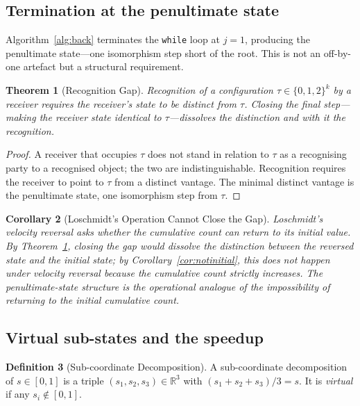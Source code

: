\documentclass[twocolumn,10pt,a4paper]{article}
\theoremstyle{thmstyle}
\newtheorem{theorem}{Theorem}[section]
\newtheorem{corollary}[theorem]{Corollary}
\theoremstyle{definition}
\newtheorem{definition}[theorem]{Definition}
\theoremstyle{remark}
\newcommand{\R}{\mathbb{R}}
\begin{document}
\subsection{Termination at the penultimate state}

Algorithm~\ref{alg:back} terminates the \texttt{while} loop at $j=1$,
producing the penultimate state---one isomorphism step short of the
root. This is not an off-by-one artefact but a structural requirement.

\begin{theorem}[Recognition Gap]
\label{thm:recog}
Recognition of a configuration $\tau\in\{0,1,2\}^{k}$ by a receiver
requires the receiver's state to be distinct from $\tau$. Closing the
final step---making the receiver state identical to $\tau$---dissolves
the distinction and with it the recognition.
\end{theorem}

\begin{proof}
A receiver that occupies $\tau$ does not stand in relation to $\tau$
as a recognising party to a recognised object; the two are
indistinguishable. Recognition requires the receiver to point to $\tau$
from a distinct vantage. The minimal distinct vantage is the
penultimate state, one isomorphism step from $\tau$.
\end{proof}

\begin{corollary}[Loschmidt's Operation Cannot Close the Gap]
\label{cor:losch_gap}
Loschmidt's velocity reversal asks whether the cumulative count can
return to its initial value. By Theorem~\ref{thm:recog}, closing the
gap would dissolve the distinction between the reversed state and the
initial state; by Corollary~\ref{cor:notinitial}, this does not happen
under velocity reversal because the cumulative count strictly
increases. The penultimate-state structure is the operational analogue
of the impossibility of returning to the initial cumulative count.
\end{corollary}

\subsection{Virtual sub-states and the speedup}

\begin{definition}[Sub-coordinate Decomposition]
\label{def:sub}
A sub-coordinate decomposition of $s\in[0,1]$ is a triple
$(s_{1},s_{2},s_{3})\in\R^{3}$ with $(s_{1}+s_{2}+s_{3})/3=s$. It is
\emph{virtual} if any $s_{i}\notin[0,1]$.
\end{definition}
\end{document}
